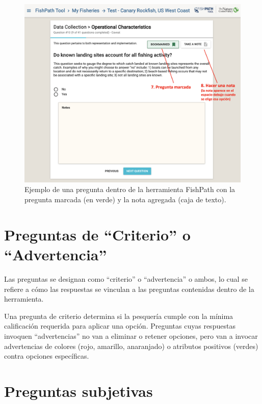 \documentclass[
  11pt,
]{book}
\begin{document}
\begin{figure}
 
 {\centering \includegraphics[width=0.95\linewidth]{images/bookmark-notes-es} 
 
 }
 
 \caption{Ejemplo de una pregunta dentro de la herramienta FishPath con la pregunta marcada (en verde) y la nota agregada (caja de texto).}\label{fig:bookmark-notes}
 \end{figure}

\hypertarget{preguntas-de-criterio-o-advertencia}{%
\section{Preguntas de ``Criterio'' o ``Advertencia''}\label{preguntas-de-criterio-o-advertencia}}

Las preguntas se designan como ``criterio'' o ``advertencia'' o ambos, lo cual se refiere a cómo las respuestas se vinculan a las preguntas contenidas dentro de la herramienta.

Una pregunta de criterio determina si la pesquería cumple con la mínima calificación requerida para aplicar una opción. Preguntas cuyas respuestas invoquen ``advertencias'' no van a eliminar o retener opciones, pero van a invocar advertencias de colores (rojo, amarillo, anaranjado) o atributos positivos (verdes) contra opciones específicas.

\hypertarget{preguntas-subjetivas}{%
\section{Preguntas subjetivas}\label{preguntas-subjetivas}}
\end{document}
